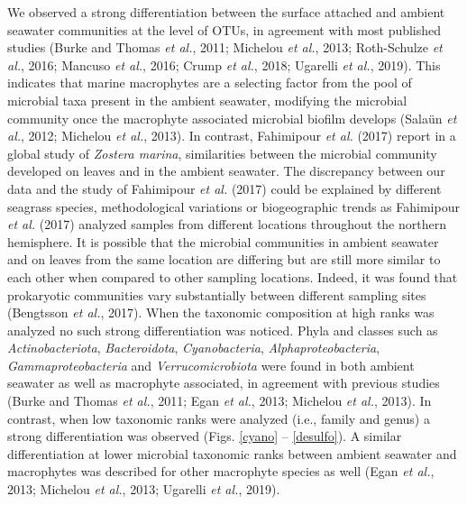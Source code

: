 \documentclass[12pt,]{article}
\begin{document}
We observed a strong differentiation between the surface attached and
ambient seawater communities at the level of OTUs, in agreement with
most published studies (Burke and Thomas \emph{et al.}, 2011; Michelou
\emph{et al.}, 2013; Roth-Schulze \emph{et al.}, 2016; Mancuso \emph{et
al.}, 2016; Crump \emph{et al.}, 2018; Ugarelli \emph{et al.}, 2019).
This indicates that marine macrophytes are a selecting factor from the
pool of microbial taxa present in the ambient seawater, modifying the
microbial community once the macrophyte associated microbial biofilm
develops (Salaün \emph{et al.}, 2012; Michelou \emph{et al.}, 2013). In
contrast, Fahimipour \emph{et al.} (2017) report in a global study of
\emph{Zostera marina}, similarities between the microbial community
developed on leaves and in the ambient seawater. The discrepancy between
our data and the study of Fahimipour \emph{et al.} (2017) could be
explained by different seagrass species, methodological variations or
biogeographic trends as Fahimipour \emph{et al.} (2017) analyzed samples
from different locations throughout the northern hemisphere. It is
possible that the microbial communities in ambient seawater and on
leaves from the same location are differing but are still more similar
to each other when compared to other sampling locations. Indeed, it was
found that prokaryotic communities vary substantially between different
sampling sites (Bengtsson \emph{et al.}, 2017). When the taxonomic
composition at high ranks was analyzed no such strong differentiation
was noticed. Phyla and classes such as \emph{Actinobacteriota},
\emph{Bacteroidota}, \emph{Cyanobacteria}, \emph{Alphaproteobacteria},
\emph{Gammaproteobacteria} and \emph{Verrucomicrobiota} were found in
both ambient seawater as well as macrophyte associated, in agreement
with previous studies (Burke and Thomas \emph{et al.}, 2011; Egan
\emph{et al.}, 2013; Michelou \emph{et al.}, 2013). In contrast, when
low taxonomic ranks were analyzed (i.e., family and genus) a strong
differentiation was observed (Figs. \ref{cyano} -- \ref{desulfo}). A
similar differentiation at lower microbial taxonomic ranks between
ambient seawater and macrophytes was described for other macrophyte
species as well (Egan \emph{et al.}, 2013; Michelou \emph{et al.}, 2013;
Ugarelli \emph{et al.}, 2019).
\end{document}
